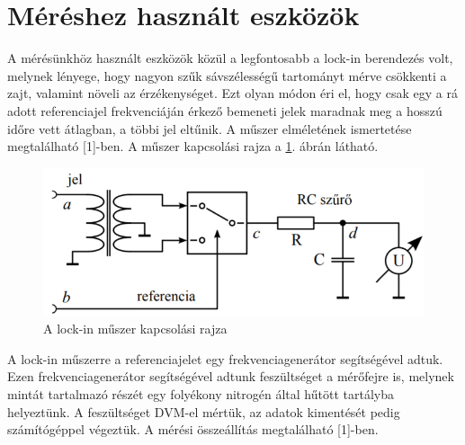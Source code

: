 \documentclass[12pt,a4paper]{article}
\begin{document}
\section{Méréshez használt eszközök}
\hspace*{10pt} A mérésünkhöz használt eszközök közül a legfontosabb a lock-in berendezés volt, melynek lényege, hogy nagyon szűk sávszélességű tartományt mérve csökkenti a zajt, valamint növeli az érzékenységet. Ezt olyan módon éri el, hogy csak egy a rá adott referenciajel frekvenciáján érkező bemeneti jelek maradnak meg a hosszú időre vett átlagban, a többi jel eltűnik. A műszer elméletének ismertetése megtalálható [1]-ben. A műszer kapcsolási rajza a \ref{fig:1}. ábrán látható.\\
\begin{figure}[!h]
\centering
\includegraphics[scale=0.55]{lockin}
\caption{A lock-in műszer kapcsolási rajza}
\label{fig:1}
\end{figure}
\newline
\hspace*{10pt}A lock-in műszerre a referenciajelet egy frekvenciagenerátor segítségével adtuk. Ezen frekvenciagenerátor segítségével adtunk feszültséget a mérőfejre is, melynek mintát tartalmazó részét egy folyékony nitrogén által hűtött tartályba helyeztünk. A feszültséget DVM-el mértük, az adatok kimentését pedig számítógéppel végeztük. A mérési összeállítás megtalálható [1]-ben.
\end{document}
